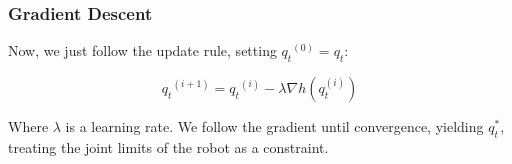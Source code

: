 \documentclass{article}
\begin{document}
\subsubsection{Gradient Descent}

Now, we just follow the update rule, setting ${q_t}^{(0)} = q_t$:

$$ {q_t}^{(i + 1)} = {q_t}^{(i)} - \lambda \nabla h(q_t^{(i)}) $$

\noindent Where $\lambda$ is a learning rate. We follow the gradient until
convergence, yielding $q^*_t$, treating the joint limits of the robot as a
constraint.
\end{document}
